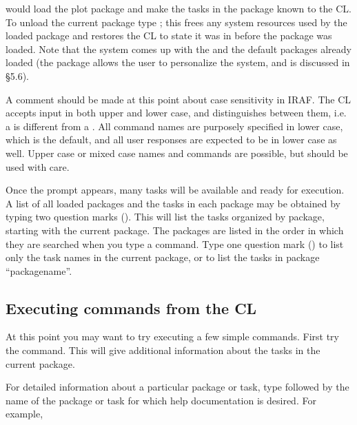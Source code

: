 \begin{quotation}\noindent
{} 
\end{quotation}

\noindent
would load the plot package and make the tasks in the package known to the CL.
To unload the current package type ; this frees any system
resources used by the loaded package and restores the CL to state it was in
before the package was loaded.
Note that the system comes up with the 
and the default  packages already loaded (the 
package allows the user to personalize the system, and is discussed in \S 5.6).

A comment should be made at this point about case sensitivity in IRAF.  
The CL accepts input in both upper 
and lower case, and distinguishes between them, i.e. a  is 
different from a .  All command names are purposely
specified in lower case, which is the default, and all user responses
are expected to be in lower case as well.  Upper case or mixed case
names and commands are possible, but should be used with care.

Once the  prompt appears, many tasks will be available and
ready for execution. A list of all loaded packages and the tasks in each
package may be obtained by typing two question marks ().
This will list the tasks organized by package, starting with the current
package. The packages are listed in the
order in which they are searched when you type a command. Type one question
mark () to list only the task names in the current package,
or  to list the tasks in 
package ``packagename''.

\subsection{Executing commands from the CL}

\ppind
At this point you may want to try executing a few simple commands.
First try the  command.  This will give additional 
information about the tasks in the current package.

\begin{quotation}\noindent
{}  
\end{quotation}

For detailed information about a particular package or task, type
 followed by the name of the package or task for which help
documentation is desired.  For example,

